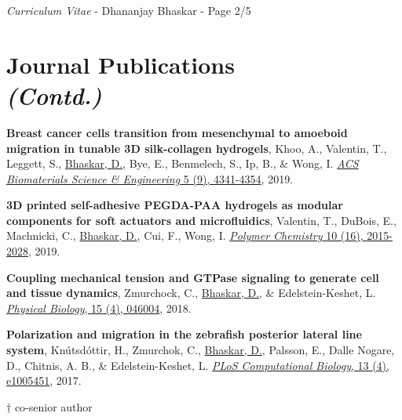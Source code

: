 \documentclass[margin,line]{res}
\begin{document}
\begin{resume}
\newpage
\begin{flushright}
\textit{Curriculum Vitae} - Dhananjay Bhaskar - Page 2/5
\end{flushright}
\vspace*{.15cm}

\section{\sc Journal Publications \\ \textit{(Contd.)}}
{\renewcommand\leftmargini{0em}
\begin{etaremune}[start=4]
\item{\bf Breast cancer cells transition from mesenchymal to amoeboid migration in tunable 3D silk-collagen hydrogels}, 
Khoo, A., Valentin, T., Leggett, S., \underline{Bhaskar, D.}, Bye, E., Benmelech, S., Ip, B., \& Wong, I. 
\href{https://pubs.acs.org/doi/abs/10.1021/acsbiomaterials.9b00519}{\textit{ACS Biomaterials Science \& Engineering} 5 (9), 4341-4354}, 2019.
\vspace*{.1cm}
\item{\bf 3D printed self-adhesive PEGDA-PAA hydrogels as modular components for soft actuators and microfluidics}, 
Valentin, T., DuBois, E., Machnicki, C., \underline{Bhaskar, D.}, Cui, F., Wong, I. 
\href{https://pubs.rsc.org/ko/content/articlehtml/2019/py/c9py00211a}{\textit{Polymer Chemistry} 10 (16), 2015-2028}, 2019.
\vspace*{.1cm}
\item{\bf Coupling mechanical tension and GTPase signaling to generate cell and tissue dynamics}, 
Zmurchock, C., \underline{Bhaskar, D.}, \& Edelstein-Keshet, L. 
\href{https://iopscience.iop.org/article/10.1088/1478-3975/aab1c0/meta}{\textit{Physical Biology}, 15 (4), 046004}, 2018.
\vspace*{.1cm}
\item{\bf Polarization and migration in the zebrafish posterior lateral line system}, 
Kn\'{u}tsd\'{o}ttir, H., Zmurchok, C., \underline{Bhaskar, D.}, Palsson, E., Dalle Nogare, D., Chitnis, A. B., \& Edelstein-Keshet, L. 
\href{https://journals.plos.org/ploscompbiol/article?id=10.1371/journal.pcbi.1005451&rev=2}{\textit{PLoS Computational Biology}, 13 (4), e1005451}, 2017.
\item[] $\dagger$ co-senior author
\end{etaremune}
}

\vspace*{.15cm}


\end{resume}
\end{document}
